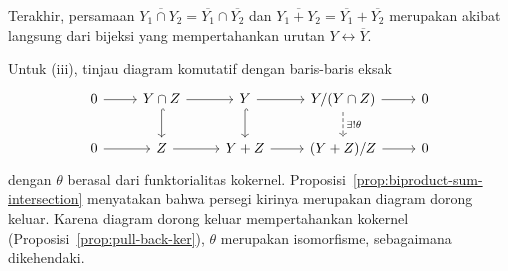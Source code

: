 \begin{bukti}
	Terakhir, persamaan
	$\overline{Y_1\cap Y_2}=\overline{Y_1}\cap\overline{Y_2}$ dan
	$\overline{Y_1+Y_2}=\overline{Y_1}+\overline{Y_2}$ merupakan akibat
	langsung dari bijeksi yang mempertahankan urutan
	$Y\leftrightarrow\overline{Y}$.

	Untuk (iii), tinjau diagram komutatif dengan baris-baris eksak
	\[\begin{tikzcd}
		0 \arrow[r] & Y \cap Z \arrow[r] \arrow[hookrightarrow, d] & Y \arrow[hookrightarrow, d] \arrow[r] & Y/(Y \cap Z) \arrow[r] \arrow[dashed, d, "\exists! \theta"] & 0 \\
		0 \arrow[r] & Z \arrow[r] & Y+Z \arrow[r] & (Y+Z)/Z \arrow[r] & 0
	\end{tikzcd}\]
	dengan $\theta$ berasal dari funktorialitas kokernel.
	Proposisi~\ref{prop:biproduct-sum-intersection} menyatakan bahwa persegi
	kirinya merupakan diagram dorong keluar. Karena diagram dorong keluar mempertahankan
	kokernel (Proposisi~\ref{prop:pull-back-ker}), $\theta$ merupakan
	isomorfisme, sebagaimana dikehendaki.
\end{bukti}

